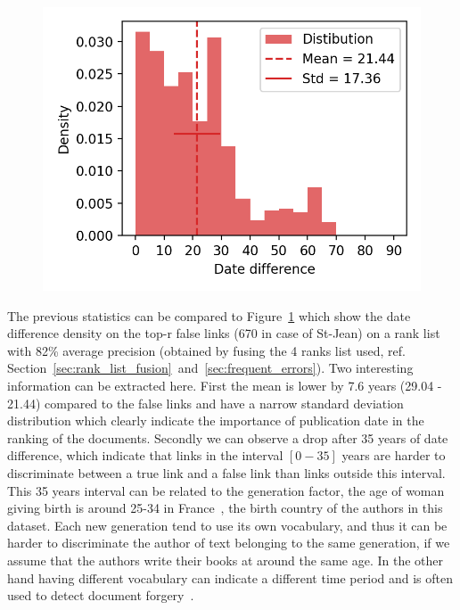 \begin{figure}
  \label{fig:dates_differences_r_false}
  \includegraphics[width=\linewidth]{img/dates_differences_r_false.png}
\end{figure}

The previous statistics can be compared to Figure~\ref{fig:dates_differences_r_false} which show the date difference density on the top-r false links (670 in case of St-Jean) on a rank list with 82\% average precision (obtained by fusing the 4 ranks list used, ref. Section~\ref{sec:rank_list_fusion}~and~\ref{sec:frequent_errors}).
Two interesting information can be extracted here.
First the mean is lower by 7.6 years (29.04 - 21.44) compared to the false links and have a narrow standard deviation distribution which clearly indicate the importance of publication date in the ranking of the documents.
Secondly we can observe a drop after 35 years of date difference, which indicate that links in the interval $\left[0-35\right]$ years are harder to discriminate between a true link and a false link than links outside this interval.
This 35 years interval can be related to the generation factor, the age of woman giving birth is around 25-34 in France~\cite{generations}, the birth country of the authors in this dataset.
Each new generation tend to use its own vocabulary, and thus it can be harder to discriminate the author of text belonging to the same generation, if we assume that the authors write their books at around the same age.
In the other hand having different vocabulary can indicate a different time period and is often used to detect document forgery~\cite{savoy_stylo}.

